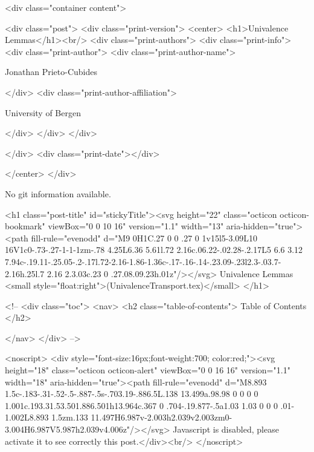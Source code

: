       <div class="container content">
        







<div class="post">
  <div class="print-version">
    <center>
      <h1>Univalence Lemmas</h1><br/>
        <div class="print-authors">
          <div class="print-info">
            <div class="print-author">
              <div class="print-author-name">
                
                  Jonathan Prieto-Cubides
                
              </div>
              <div class="print-author-affiliation">
                
                  University of Bergen
                
                </div>
            </div>
          </div>
          
          
        </div>
        <div class="print-date"></div>
        
        
    </center>
  </div>

  
  No git information available.
  

  <h1 class="post-title" id="stickyTitle"><svg height="22" class="octicon octicon-bookmark" viewBox="0 0 10 16" version="1.1" width="13" aria-hidden="true"><path fill-rule="evenodd" d="M9 0H1C.27 0 0 .27 0 1v15l5-3.09L10 16V1c0-.73-.27-1-1-1zm-.78 4.25L6.36 5.61l.72 2.16c.06.22-.02.28-.2.17L5 6.6 3.12 7.94c-.19.11-.25.05-.2-.17l.72-2.16-1.86-1.36c-.17-.16-.14-.23.09-.23l2.3-.03.7-2.16h.25l.7 2.16 2.3.03c.23 0 .27.08.09.23h.01z"/></svg> Univalence Lemmas <small style="float:right">(UnivalenceTransport.tex)</small>
  </h1>

  <!-- 
  <div class="toc">
    <nav>
    <h2 class="table-of-contents"> Table of Contents </h2>
      

    </nav>
  </div>
   -->

  <noscript>
  <div style="font-size:16px;font-weight:700; color:red;"><svg height="18" class="octicon octicon-alert" viewBox="0 0 16 16" version="1.1" width="18" aria-hidden="true"><path fill-rule="evenodd" d="M8.893 1.5c-.183-.31-.52-.5-.887-.5s-.703.19-.886.5L.138 13.499a.98.98 0 0 0 0 1.001c.193.31.53.501.886.501h13.964c.367 0 .704-.19.877-.5a1.03 1.03 0 0 0 .01-1.002L8.893 1.5zm.133 11.497H6.987v-2.003h2.039v2.003zm0-3.004H6.987V5.987h2.039v4.006z"/></svg> Javascript is disabled, please activate it to see correctly this post.</div><br/>
  </noscript>

